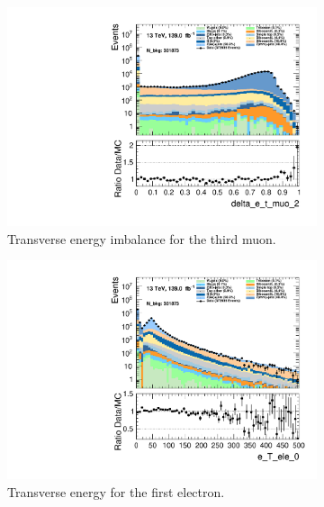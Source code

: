 \begin{figure}
    \centering
    \begin{subfigure}{.49\textwidth}
        \includegraphics[width=\textwidth]{Figures/MC_Data_comp/delta_e_t_muo_2.pdf}
        \caption{Transverse energy imbalance for the third muon.}
        \label{fig:delta_e_t_muo2}
    \end{subfigure}
    \hfill
    \begin{subfigure}{.49\textwidth}
        \includegraphics[width=\textwidth]{Figures/MC_Data_comp/e_T_ele_0.pdf}
        \caption{ Transverse energy for the first electron.}
        \label{fig:e_T_ele0}
    \end{subfigure}
    \hfill 
    \begin{subfigure}{.49\textwidth}

\end{subfigure}
\end{figure}
